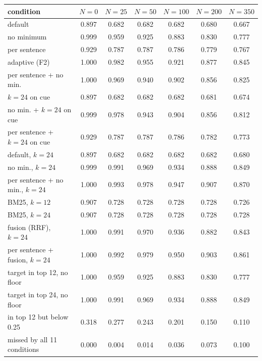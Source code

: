 \begin{tabular}{lcccccc}
\toprule
condition & $N=0$ & $N=25$ & $N=50$ & $N=100$ & $N=200$ & $N=350$ \\
\midrule
default & 0.897 & 0.682 & 0.682 & 0.682 & 0.680 & 0.667 \\
no minimum & 0.999 & 0.959 & 0.925 & 0.883 & 0.830 & 0.777 \\
per sentence & 0.929 & 0.787 & 0.787 & 0.786 & 0.779 & 0.767 \\
adaptive (F2) & 1.000 & 0.982 & 0.955 & 0.921 & 0.877 & 0.845 \\
per sentence + no min. & 1.000 & 0.969 & 0.940 & 0.902 & 0.856 & 0.825 \\
$k{=}24$ on cue & 0.897 & 0.682 & 0.682 & 0.682 & 0.681 & 0.674 \\
no min. + $k{=}24$ on cue & 0.999 & 0.978 & 0.943 & 0.904 & 0.856 & 0.812 \\
per sentence + $k{=}24$ on cue & 0.929 & 0.787 & 0.787 & 0.786 & 0.782 & 0.773 \\
default, $k{=}24$ & 0.897 & 0.682 & 0.682 & 0.682 & 0.682 & 0.680 \\
no min., $k{=}24$ & 0.999 & 0.991 & 0.969 & 0.934 & 0.888 & 0.849 \\
per sentence + no min., $k{=}24$ & 1.000 & 0.993 & 0.978 & 0.947 & 0.907 & 0.870 \\
BM25, $k{=}12$ & 0.907 & 0.728 & 0.728 & 0.728 & 0.728 & 0.726 \\
BM25, $k{=}24$ & 0.907 & 0.728 & 0.728 & 0.728 & 0.728 & 0.728 \\
fusion (RRF), $k{=}24$ & 1.000 & 0.991 & 0.970 & 0.936 & 0.882 & 0.843 \\
per sentence + fusion, $k{=}24$ & 1.000 & 0.992 & 0.979 & 0.950 & 0.903 & 0.861 \\
\midrule
target in top 12, no floor & 1.000 & 0.959 & 0.925 & 0.883 & 0.830 & 0.777 \\
target in top 24, no floor & 1.000 & 0.991 & 0.969 & 0.934 & 0.888 & 0.849 \\
in top 12 but below 0.25 & 0.318 & 0.277 & 0.243 & 0.201 & 0.150 & 0.110 \\
missed by all 11 conditions & 0.000 & 0.004 & 0.014 & 0.036 & 0.073 & 0.100 \\
\bottomrule
\end{tabular}
